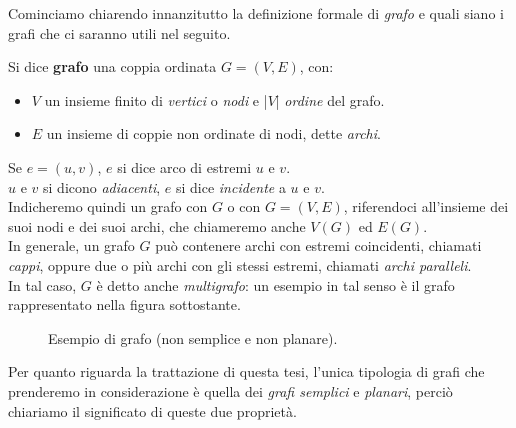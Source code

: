 \documentclass[a4paper,12pt,titlepage]{report}
\begin{document}
	 Cominciamo chiarendo innanzitutto la definizione formale di \emph{grafo} e quali siano i grafi che ci saranno utili nel seguito.
	 \theoremstyle{definition}
	 \begin{dfn}
	 Si dice {\bfseries grafo} una coppia ordinata $G = (V, E)$, con:
	 \begin{itemize}
	 	\item $V$ un insieme finito di \emph{vertici} o \emph{nodi} e |$V$| \emph{ordine} del grafo.
	 	\item $E$ un insieme di coppie non ordinate di nodi, dette \emph{archi}.
	 \end{itemize}
	 Se $e = (u, v)$, $e$ si dice arco di estremi $u$ e $v$.
	 \\$u$ e $v$ si dicono \emph{adiacenti}, $e$ si dice \emph{incidente} a $u$ e $v$.
	 \\Indicheremo quindi un grafo con $G$ o con $G = (V, E)$, riferendoci all'insieme dei suoi nodi e dei suoi archi, che chiameremo anche $V(G)$ ed $E(G)$.
	 \\In generale, un grafo $G$ può contenere archi con estremi coincidenti, chiamati \emph{cappi}, oppure due o più archi con gli stessi estremi, chiamati \emph{archi paralleli}. 
	 \\In tal caso, $G$ è detto anche \emph{multigrafo}: un esempio in tal senso è il grafo rappresentato nella figura sottostante.
	 \clearpage 
	\end{dfn}
	\begin{figure}[h]
		\centering
		\vspace{0.4cm}
		\caption{Esempio di grafo (non semplice e non planare).}
	\end{figure}
	Per quanto riguarda la trattazione di questa tesi, l'unica tipologia di grafi che prenderemo in considerazione è quella dei \emph{grafi semplici} e \emph{planari}, perciò chiariamo il significato di queste due proprietà.
	
\end{document}
